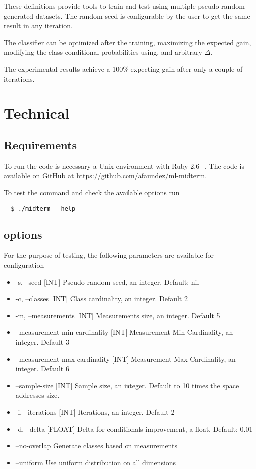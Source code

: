 \documentclass[letterpaper, conference]{IEEEtran}
\begin{document}
These definitions provide tools to train and test using multiple pseudo-random generated datasets. The random seed is configurable by the user to get the same result in any iteration.

The classifier can be optimized after the training, maximizing the expected gain, modifying the class conditional probabilities using, and arbitrary $\Delta$.

The experimental results achieve a 100\% expecting gain after only a couple of iterations.

\section{Technical}

\subsection{Requirements}

To run the code is necessary a Unix environment with Ruby 2.6+. The code is available on GitHub at \url{https://github.com/afaundez/ml-midterm}.

To test the command and check the available options run

\begin{verbatim}
  $ ./midterm --help
\end{verbatim}

\subsection{options}

For the purpose of testing, the following parameters are available for configuration

\begin{itemize}
    \item-s, --seed [INT]                 Pseudo-random seed, an integer. Default: nil
    \item-c, --classes [INT]              Class cardinality, an integer. Default 2
    \item-m, --measurements [INT]         Measurements size, an integer. Default 5
    \item    --measurement-min-cardinality [INT]
                                     Measurement Min Cardinality, an integer. Default 3
    \item    --measurement-max-cardinality [INT]
                                     Measurement Max Cardinality, an integer. Default 6
    \item    --sample-size [INT]          Sample size, an integer. Default to 10 times the  space addresses size.
    \item-i, --iterations [INT]           Iterations, an integer. Default 2
    \item-d, --delta [FLOAT]              Delta for conditionals improvement, a float. Default: 0.01
    \item    --no-overlap                 Generate classes based on measurements
    \item    --uniform                    Use uniform distribution on all dimensions
\end{itemize}
\end{document}
